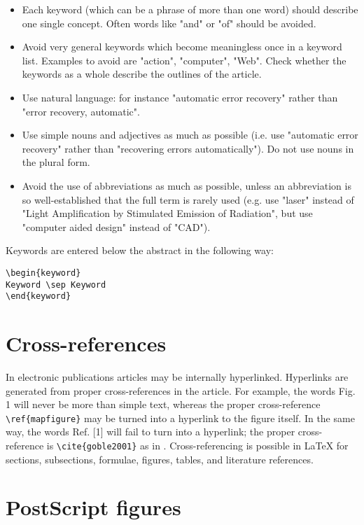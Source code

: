 \documentclass{elsart3p}    %
\begin{document}
\begin{itemize}
  \item Each keyword (which can be a phrase of more than one word)
   should describe one single concept. Often words like "and"
   or "of" should be avoided.
  \item Avoid very general keywords which become meaningless once
   in a keyword list. Examples to avoid are "action",
   "computer", "Web". Check whether the keywords as a
   whole describe the outlines of the article.
  \item Use natural language: for instance "automatic error
   recovery" rather than "error recovery, automatic".
  \item Use simple nouns and adjectives as much as possible
   (i.e. use "automatic error recovery" rather than
   "recovering errors automatically"). Do not use nouns in the
    plural form.
  \item Avoid the use of abbreviations as much as possible, unless
   an abbreviation is so well-established that the full term
   is rarely used (e.g. use "laser" instead of "Light
   Amplification by Stimulated Emission of Radiation", but use
   "computer aided design" instead of "CAD").
\end{itemize}

Keywords are entered below the abstract in the following way:
\begin{verbatim}
\begin{keyword}
Keyword \sep Keyword
\end{keyword}
\end{verbatim}

\section{Cross-references}
\label{xrefs}

In electronic publications articles may be internally hyperlinked.
Hyperlinks are generated from proper cross-references in the article.
For example, the words Fig. 1 will never be more than simple text,
whereas the proper cross-reference \verb|\ref{mapfigure}| may be
turned into a hyperlink to the figure itself.  In the same way, the
words Ref. [1] will fail to turn into a hyperlink; the proper
cross-reference is \verb|\cite{goble2001}| as in \cite{goble2001}.
Cross-referencing is possible in \LaTeX{} for sections, subsections,
formulae, figures, tables, and literature references.

\section{PostScript figures}
\label{psfigs}
\end{document}
